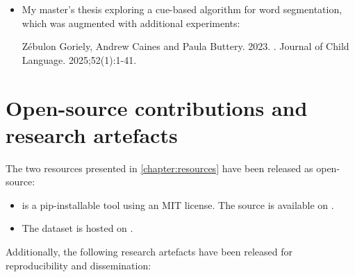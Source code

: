 \begin{itemize}
\item My master's thesis exploring a cue-based algorithm for word segmentation, which was augmented with additional experiments:
\begin{mdframed}[linewidth=1pt]
    Z\'ebulon Goriely, Andrew Caines and Paula Buttery. 2023. \href{https://www.cambridge.org/core/journals/journal-of-child-language/article/word-segmentation-from-transcriptions-of-childdirected-speech-using-lexical-and-sublexical-cues/5D206536C878ADA80026ED8E2E72F848}{}. Journal of Child Language. 2025;52(1):1-41.
\end{mdframed}
\end{itemize}

\section{Open-source contributions and research artefacts}

The two resources presented in \cref{chapter:resources} have been released as open-source:

\begin{itemize}
\item \gpp is a pip-installable tool using an MIT license. The source is available on \href{https://github.com/codebyzeb/g2p-plus}{}. 
\item The \ipachildes dataset is hosted on \href{https://huggingface.co/datasets/phonemetransformers/IPA-CHILDES}{}.
\end{itemize}

Additionally, the following research artefacts have been released for reproducibility and dissemination:

